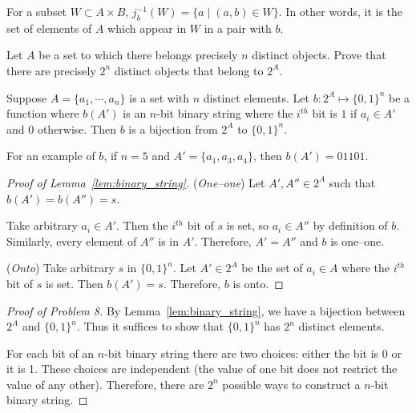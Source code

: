 For a subset $W \subset A \times B$, $j_b^{-1}(W) = \{a \mid (a,b) \in W \}$.
In other words, it is the set of elements of $A$ which appear in $W$ in a pair with $b$.

\begin{problem}[8]
	Let $A$ be a set to which there belongs precisely $n$ distinct objects.
	Prove that there are precisely $2^n$ distinct objects that belong to $2^A$.
\end{problem}

\begin{lemma} \label{lem:binary_string}
	Suppose $A = \{a_1,\cdots,a_n\}$ is a set with $n$ distinct elements.
	Let $b : 2^A \mapsto \{0,1\}^n$ be a function where $b(A')$ is an $n$-bit binary string where the $i^{th}$ bit is $1$ if $a_i \in A'$ and $0$ otherwise.
	Then $b$ is a bijection from $2^A$ to $\{0,1\}^n$.
\end{lemma}

For an example of $b$, if $n = 5$ and $A' = \{a_1,a_3,a_4\}$, then $b(A') = 01101$. %

\begin{proof}[Proof of Lemma~\ref{lem:binary_string}]
	(\textit{One--one})
	Let $A', A'' \in 2^A$ such that $b(A') = b(A'') = s$.

	Take arbitrary $a_i \in A'$.
	Then the $i^{th}$ bit of $s$ is set, so $a_i \in A''$ by definition of $b$.
	Similarly, every element of $A''$ is in $A'$.
	Therefore, $A' = A''$ and $b$ is one--one.

	(\textit{Onto})
	Take arbitrary $s$ in $\{0,1\}^n$.
	Let $A' \in 2^{A}$ be the set of $a_i \in A$ where the $i^{th}$ bit of $s$ is set.
	Then $b(A') = s$.
	Therefore, $b$ is onto.
\end{proof}

\begin{proof}[Proof of Problem 8]
	By Lemma~\ref{lem:binary_string}, we have a bijection between $2^A$ and $\{0,1\}^n$.
	Thus it suffices to show that $\{0,1\}^n$ has $2^n$ distinct elements.

	For each bit of an $n$-bit binary string there are two choices: either the bit is 0 or it is 1.
	These choices are independent (the value of one bit does not restrict the value of any other).
	Therefore, there are $2^n$ possible ways to construct a $n$-bit binary string.
\end{proof}
